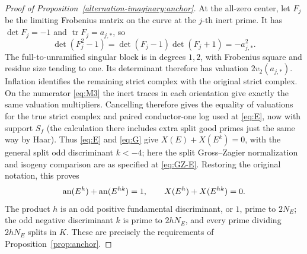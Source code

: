 \begin{proof}[Proof of Proposition~\ref{alternation-imaginary:anchor}]
At the all-zero center, let \(F_j\) be the limiting Frobenius matrix on the curve at the \(j\)-th inert prime. It has \(\det F_j=-1\) and \(\operatorname{tr}F_j=a_{j,*}\), so
\[
 \det(F_j^2-1)=\det(F_j-1)\det(F_j+1)=-a_{j,*}^2.
\]
The full-to-unramified singular block is in degrees \(1,2\), with Frobenius square and residue size tending to one. Its determinant therefore has valuation \(2v_2(a_{j,*})\). Inflation identifies the remaining strict complex with the original strict complex. On the numerator \eqref{eq:M3} the inert traces in each orientation give exactly the same valuation multipliers. Cancelling therefore gives the equality of valuations for the true strict complex and paired conductor-one log used at \eqref{eq:E}, now with support \(S_f\) (the calculation there includes extra split good primes just the same way by Haar). Thus \eqref{eq:E} and \eqref{eq:G} give \(X(E)+X(E^k)=0\), with the general split odd discriminant \(k<-4\); here the split Gross--Zagier normalization and isogeny comparison are as specified at \eqref{eq:GZ-E}. Restoring the original notation, this proves
\[
 \operatorname{an}(E^h)+\operatorname{an}(E^{hk})=1,\qquad X(E^h)+X(E^{hk})=0.
\]
The product \(h\) is an odd positive fundamental discriminant, or \(1\), prime to \(2N_E\); the odd negative discriminant \(k\) is prime to \(2hN_E\), and every prime dividing \(2hN_E\) splits in \(K\). These are precisely the requirements of Proposition~\ref{prop:anchor}.
\end{proof} 
